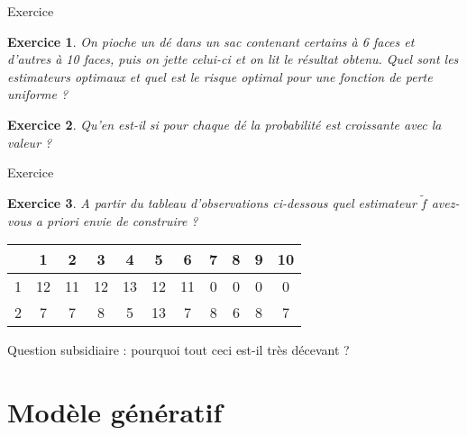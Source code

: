 \documentclass[11pt]{beamer}
\newtheorem{exercice}{Exercice}
\begin{document}
\begin{frame}{Exercice}

\begin{exercice}
On pioche un dé dans un sac contenant certains à 6 faces et d'autres à 10 faces, puis on jette celui-ci et on lit le résultat obtenu. Quel sont les estimateurs optimaux et quel est le risque optimal pour une fonction de perte uniforme ? 
\end{exercice}

\begin{exercice}
Qu'en est-il si pour chaque dé la probabilité est croissante avec la valeur ?
\end{exercice}
\end{frame}

\begin{frame}{Exercice}

\begin{exercice}
A partir du tableau d'observations ci-dessous quel estimateur $\tilde{f}$ avez-vous a priori envie de construire ?
\end{exercice}

\vspace{0.2cm}

\begin{center}
\begin{tabular}{|l|c|c|c|c|c|c|c|c|c|c|}
\hline
&1&2&3&4&5&6&7&8&9&10 \\
\hline
1&12&11&12&13&12&11&0&0&0&0\\
\hline
2&7&7&8&5&13&7&8&6&8&7\\
\hline
\end{tabular}
\end{center}

\vspace{0.2cm}

Question subsidiaire : pourquoi tout ceci est-il très décevant ?

\end{frame}



\section{Modèle génératif}
\end{document}
